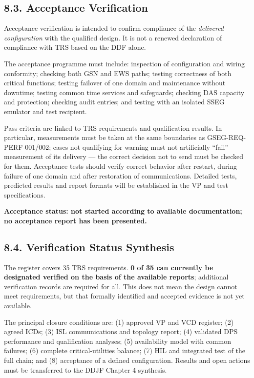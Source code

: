 \subsection{8.3. Acceptance Verification}\label{ddjf-8-3}

Acceptance verification is intended to confirm compliance of the \emph{delivered configuration} with the qualified design. It is not a renewed declaration of compliance with TRS based on the DDF alone.

The acceptance programme must include: inspection of configuration and wiring conformity; checking both GSN and EWS paths; testing correctness of both critical functions; testing failover of one domain and maintenance without downtime; testing common time services and safeguards; checking DAS capacity and protection; checking audit entries; and testing with an isolated SSEG emulator and test recipient.

Pass criteria are linked to TRS requirements and qualification results. In particular, measurements must be taken at the same boundaries as GSEG-REQ-PERF-001/\allowbreak{}002; cases not qualifying for warning must not artificially “fail” measurement of its delivery — the correct decision not to send must be checked for them. Acceptance tests should verify correct behavior after restart, during failure of one domain and after restoration of communications. Detailed tests, predicted results and report formats will be established in the VP and test specifications.

\textbf{Acceptance status: not started according to available documentation; no acceptance report has been presented.}

\subsection{8.4. Verification Status Synthesis}\label{ddjf-8-4}

The register covers 35 TRS requirements. \textbf{0 of 35 can currently be designated verified on the basis of the available reports}; additional verification records are required for all. This does not mean the design cannot meet requirements, but that formally identified and accepted evidence is not yet available.

The principal closure conditions are: (1) approved VP and VCD register; (2) agreed ICDs; (3) ISL communications and topology report; (4) validated DPS performance and qualification analyses; (5) availability model with common failures; (6) complete critical-utilities balance; (7) HIL and integrated test of the full chain; and (8) acceptance of a defined configuration. Results and open actions must be transferred to the DDJF Chapter 4 synthesis.

\par\noindent{\color{TableBorderBlue}\rule{\linewidth}{0.4pt}}\par
